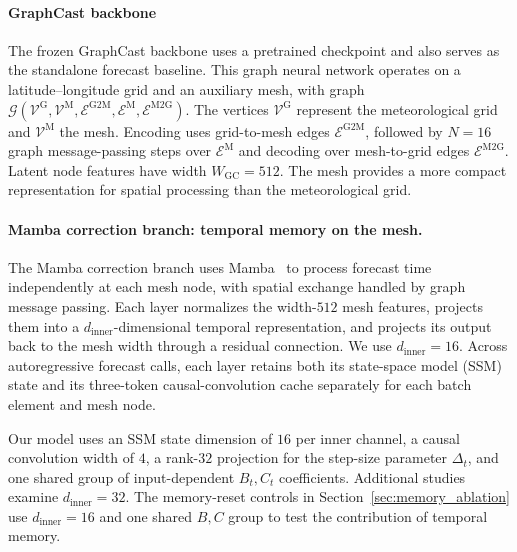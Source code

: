\documentclass{article}
\begin{document}
\paragraph{{GraphCast backbone}}
{The frozen GraphCast backbone uses a pretrained checkpoint and also serves as the standalone forecast baseline.} This graph neural network operates on a latitude--longitude grid and an auxiliary mesh, with graph $\mathcal{G}(\mathcal{V}^{\textrm{G}},\mathcal{V}^{\textrm{M}},\mathcal{E}^{\textrm{G2M}},\mathcal{E}^{\textrm{M}},\mathcal{E}^{\textrm{M2G}})$. The vertices $\mathcal{V}^{\textrm{G}}$ represent the meteorological grid and $\mathcal{V}^{\textrm{M}}$ the mesh. Encoding uses grid-to-mesh edges $\mathcal{E}^{\textrm{G2M}}$, followed by $N=16$ graph message-passing steps over $\mathcal{E}^{\textrm{M}}$ and decoding over mesh-to-grid edges $\mathcal{E}^{\textrm{M2G}}$. Latent node features have width $W_{\textrm{GC}}=512$. The mesh provides a more compact representation for spatial processing than the meteorological grid.

\paragraph{{Mamba correction branch: temporal memory on the mesh.}}
The Mamba correction branch uses Mamba~\citep{gu2023mamba} to process forecast time independently at each mesh node, with spatial exchange handled by graph message passing. Each layer normalizes the width-$512$ mesh features, projects them into a $d_{\mathrm{inner}}$-dimensional temporal representation, and projects its output back to the mesh width through a residual connection. We use $d_{\mathrm{inner}}=16$. Across autoregressive forecast calls, each layer retains both its {state-space model (SSM) state} and its three-token causal-convolution cache separately for each batch element and mesh node.

Our model uses an SSM state dimension of $16$ per inner channel, a causal convolution width of $4$, a rank-$32$ projection for the step-size parameter $\Delta_t$, and one shared group of input-dependent $B_t,C_t$ coefficients. Additional studies examine $d_{\mathrm{inner}}=32$. The memory-reset controls in Section~\ref{sec:memory_ablation} use $d_{\mathrm{inner}}=16$ and one shared $B,C$ group to test the contribution of temporal memory.
\end{document}

